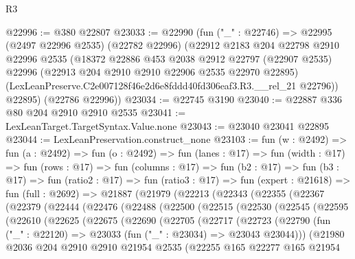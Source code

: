 \begin{lexlean}{R3}
\begin{coremodule}
@22996 := @380 @22807
@23033 := @22990
    (fun ("_" : @22746) =>
    @22995
      (@2497 @22996 @2535)
      (@22782 @22996)
      (@22912
        @2183
        @204
        @22798
        @2910
        @22996
        @2535
        (@18372
          @22886
          @453
          @2038
          @2912
          @22797
          (@22907 @2535)
          @22996
          (@22913 @204 @2910 @2910 @22906 @2535 @22970 @22895)
          (LexLeanPreserve.C2e007128f46e2d6e8fddd40fd306eaf3.R3.__rel_21 @22796))
        @22895)
      (@22786 @22996))
@23034 := @22745 @3190
@23040 := @22887 @336 @80 @204 @2910 @2910 @2535
@23041 := LexLeanTarget.TargetSyntax.Value.none
@23043 := @23040 @23041 @22895
@23044 := LexLeanPreservation.construct_none
@23103 := fun (w : @2492) =>
  fun (a : @2492) =>
  fun (o : @2492) =>
  fun (lanes : @17) =>
  fun (width : @17) =>
  fun (rows : @17) =>
  fun (columns : @17) =>
  fun (b2 : @17) =>
  fun (b3 : @17) =>
  fun (ratio2 : @17) =>
  fun (ratio3 : @17) =>
  fun (expert : @21618) =>
  fun (full : @2692) =>
  @21887
    (@21979
      (@22213
        (@22343
          (@22355
            (@22367
              (@22379
                (@22444
                  (@22476
                    (@22488
                      (@22500
                        (@22515
                          (@22530
                            (@22545
                              (@22595
                                (@22610
                                  (@22625
                                    (@22675
                                      (@22690
                                        (@22705
                                          (@22717
                                            (@22723
                                              (@22790
                                                (fun ("_" : @22120) =>
                                                @23033 (fun ("_" : @23034) => @23043 @23044)))
                                              (@21980
                                                @2036
                                                @204
                                                @2910
                                                @2910
                                                @21954
                                                @2535
                                                (@22255
                                                  @165
                                                  @22277
                                                  @165
                                                  @21954

\end{coremodule}
\end{lexlean}
